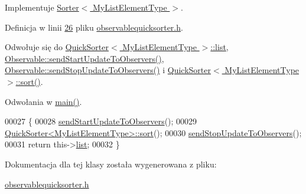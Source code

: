 Implementuje \hyperlink{class_sorter_a4a82d8151d6172802d1e60cb30c7d7d3}{Sorter$<$ My\-List\-Element\-Type $>$}.



Definicja w linii \hyperlink{observablequicksorter_8h_source_l00026}{26} pliku \hyperlink{observablequicksorter_8h_source}{observablequicksorter.\-h}.



Odwołuje się do \hyperlink{quicksorter_8h_source_l00023}{Quick\-Sorter$<$ My\-List\-Element\-Type $>$\-::list}, \hyperlink{observable_8h_source_l00029}{Observable\-::send\-Start\-Update\-To\-Observers()}, \hyperlink{observable_8h_source_l00039}{Observable\-::send\-Stop\-Update\-To\-Observers()} i \hyperlink{quicksorter_8h_source_l00069}{Quick\-Sorter$<$ My\-List\-Element\-Type $>$\-::sort()}.



Odwołania w \hyperlink{main_8cpp_source_l00022}{main()}.


\begin{DoxyCode}
00027         \{
00028                 \hyperlink{class_observable_a78df64057f152342a43f27979186a6ba}{sendStartUpdateToObservers}();
00029                 \hyperlink{class_quick_sorter_ae2b74900a972d05c06df3c9a06123c00}{QuickSorter<MyListElementType>::sort}();
00030                 \hyperlink{class_observable_a16f75ed1514a0cb7526b5a5d2b7ca7c6}{sendStopUpdateToObservers}();
00031                 \textcolor{keywordflow}{return} this->\hyperlink{class_quick_sorter_a60a7a4772c958f256962294418e83fe4}{list};
00032         \}
\end{DoxyCode}


Dokumentacja dla tej klasy została wygenerowana z pliku\-:\begin{DoxyCompactItemize}
\item 
\hyperlink{observablequicksorter_8h}{observablequicksorter.\-h}\end{DoxyCompactItemize}
